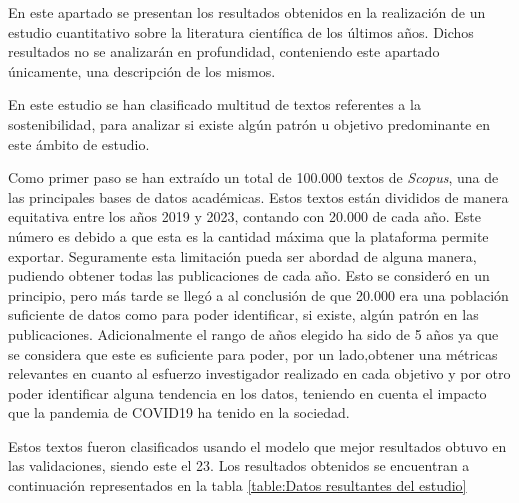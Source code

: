 En este apartado se presentan los resultados obtenidos en la realización de un
estudio cuantitativo sobre la literatura científica de los últimos años. Dichos
resultados no se analizarán en profundidad, conteniendo este apartado únicamente,
una descripción de los mismos.

En este estudio se han clasificado multitud de textos referentes a la
sostenibilidad, para analizar si existe algún patrón u objetivo predominante en
este ámbito de estudio. 

Como primer paso se han extraído un total de 100.000 textos de \textit{Scopus},
una de las principales bases de datos académicas. Estos textos están divididos
de manera equitativa entre los años 2019 y 2023, contando con 20.000 de cada
año. Este número es debido a que esta es la cantidad máxima que la plataforma
permite exportar. Seguramente esta limitación pueda ser abordad de alguna
manera, pudiendo obtener todas las publicaciones de cada año. Esto se consideró
en un principio, pero más tarde se llegó a al conclusión de que 20.000 era una
población suficiente de datos como para poder identificar, si existe, algún
patrón en las publicaciones. Adicionalmente el rango de años elegido ha sido de 5 años ya que se considera que este es suficiente para poder, por un lado,obtener una métricas relevantes en cuanto al esfuerzo investigador realizado en cada objetivo y por otro poder identificar alguna tendencia en los datos, teniendo en cuenta el impacto que la pandemia de COVID19 ha tenido en la sociedad.

Estos textos fueron clasificados usando el modelo que mejor resultados obtuvo en
las validaciones, siendo este el 23. Los resultados obtenidos se encuentran a
continuación representados en la tabla \cref{table:Datos resultantes del estudio}

